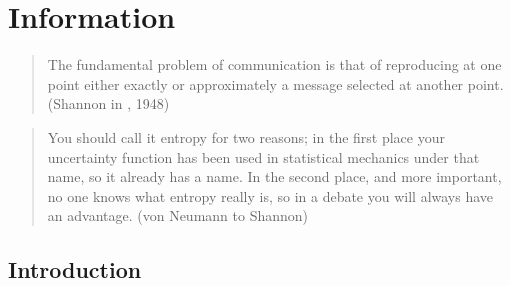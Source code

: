 









\chapter{Information}



\small
\begin{quote} The fundamental problem of communication is that of reproducing
at one point either exactly or approximately a message selected
at another point. (Shannon in \cite{shannon}, 1948)
\end{quote}

\begin{quote} You should call it entropy for two reasons; in the first
place your uncertainty function has been used in statistical mechanics
under that name, so it already has a name. In the second place, and more
important, no one knows what entropy really is, so in a debate you
will always have an advantage. (von Neumann to Shannon)
\end{quote}
\normalsize

\section{Introduction}

